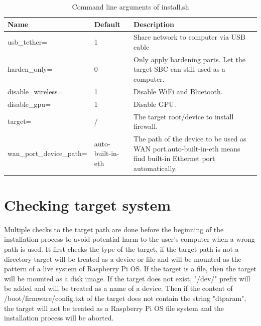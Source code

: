 \documentclass[mscthesis]{usiinfthesis}
\begin{document}
\begin{table}[H]
  \centering
  \begin{tabular}{|m{27mm}|m{30mm}|m{68mm}|}
    \hline
    Name                              & Default           & Description                                                                                                               \\
    \hline
    usb\_tether=                      & 1                 & Share network to computer via USB cable                                                                                   \\
    harden\_only=                     & 0                 & Only apply hardening parts. Let the target SBC can still used as a computer.                                              \\
    disable\_wireless=                & 1                 & Disable WiFi and Bluetooth.                                                                                               \\
    disable\_gpu=                     & 1                 & Disable GPU.                                                                                                              \\
    target=                           & /                 & The target root/device to install firewall.                                                                               \\
    wan\_port\_\newline device\_path= & auto-built-in-eth & The path of the device to be used as WAN port.\newline auto-built-in-eth means find built-in Ethernet port automatically. \\
    \hline
  \end{tabular}
  \caption{Command line arguments of install.sh}
  \label{tab:install_arg}
\end{table}

\section{Checking target system}
\paragraph{}
Multiple checks to the target path are done before the beginning of the installation process to avoid potential harm to the user's computer when a wrong path is used. It first checks the type of the target, if the target path is not a directory target will be treated as a device or file and will be mounted as the pattern of a live system of Raspberry Pi OS. If the target is a file, then the target will be mounted as a disk image. If the target does not exist, "/dev/" prefix will be added and will be treated as a name of a device. Then if the content of /boot/firmware/config.txt of the target does not contain the string "dtparam", the target will not be treated as a Raspberry Pi OS file system and the installation process will be aborted.
\end{document}
